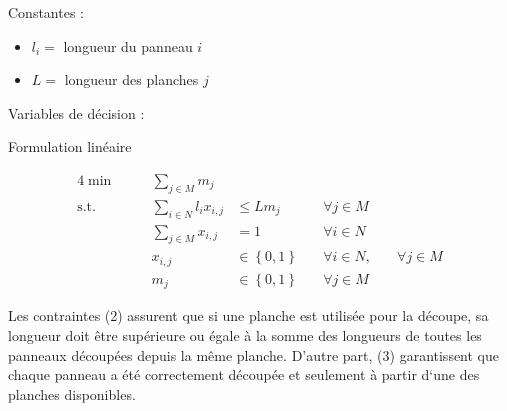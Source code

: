 \documentclass{article}[A4]
\begin{document}
Constantes :
\begin{itemize}
    \item[] $l_{i} =$ longueur du panneau $i$
    \item[] $L =$ longueur des planches $j$
\end{itemize}

Variables de décision :
\begin{algorithm}[H]
\caption{Formulation linéaire}
\begin{alignat}{4}
    \min        &\quad& \sum\limits_{j \in M} m_{j}                        &                                   &\tag{I} \label{I}\\
	\text{s.t.} &\quad& \sum\limits_{i \in N} l_{i} x_{i,j}                &\leq L m_{j}                       &\quad\forall j \in M \label{c1}\\ 
                &\quad& \sum\limits_{j \in M} x_{i,j}                      & = 1                               &\quad\forall i \in N \label{c2}\\
                &\quad& x_{i,j}                                            &\in \left\{0, 1\right\}            &\quad\forall i \in N, &\quad\forall j \in M\\
                &\quad& m_{j}                                              &\in \left\{0, 1\right\}            &\quad\forall j \in M
\end{alignat}
\end{algorithm}

Les contraintes (2) assurent que si une planche est utilisée pour la 
découpe, sa longueur doit être supérieure ou égale à la somme des 
longueurs de toutes les panneaux découpées depuis la même planche. 
D'autre part, (3) garantissent que chaque panneau a été correctement 
découpée et seulement à partir d`une des planches disponibles.
\end{document}
